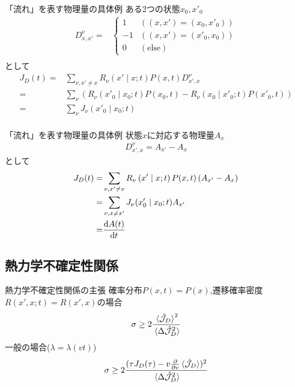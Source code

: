 \documentclass{beamer}
\begin{document}
\begin{frame}[fragile]{「流れ」を表す物理量の具体例}
    ある2つの状態$x_0,x'_0$
    \begin{align}
        D^{\nu}_{x,x'}=&
        \begin{cases}
            1 & ((x,x')=(x_0,x'_0))\\
            -1 & ((x,x')=(x'_0,x_0))\\
            0 & (\text{else})
        \end{cases}\\
    \end{align}
    として
    \begin{align}
      J_D(t)=&\sum_{\nu,x'\neq x}R_{\nu}\left(x'\mid x;t\right)P(x,t)D^{\nu}_{x',x}\\
      =&\sum_\nu\left( R_{\nu}\left(x'_0\mid x_0;t\right)P(x_0,t)-R_{\nu}\left(x_0\mid x'_0;t\right)P(x'_0,t) \right)\\
      =&\sum_\nu J_\nu(x'_0\mid x_0;t)\\
    \end{align}
\end{frame}
\begin{frame}[fragile]{「流れ」を表す物理量の具体例}
    状態$x$に対応する物理量$A_x$
    \begin{align}
        D^\nu_{x',x}=A_{x'}-A_{x}
    \end{align}
    として
    \begin{align}
      J_D(t)=&\sum_{\nu,x'\neq x}R_{\nu}\left(x'\mid x;t\right)P(x,t)\left( A_{x'}-A_x \right) \\
      =&\sum_{\nu,x\neq x'}J_\nu(x'_0\mid x_0;t)A_{x'}\\
      =&\dv{A(t)}{t}
    \end{align}
\end{frame}
\subsection{熱力学不確定性関係}
\begin{frame}[fragile]{熱力学不確定性関係の主張}
    確率分布$P(x,t)=P(x)$,遷移確率密度$R(x',x;t)=R(x',x)$の場合
    \begin{align}
        \sigma\ge 2\frac{\ev*{\hat{\mathcal{J}}_D}^2}{\ev*{\Delta\hat{\mathcal{J}}_D^2}}
    \end{align}
    一般の場合($\lambda=\lambda(vt)$)
    \begin{align}
        \sigma\ge 2\frac{(\tau J_D(\tau)-v\pdv{v}\ev*{\hat{\mathcal{J}}_D})^2}{\ev*{\Delta\hat{\mathcal{J}}_D^2}}
        \label{eq:thermal_uncertain_general}
      \end{align}
\end{frame}
\end{document}
